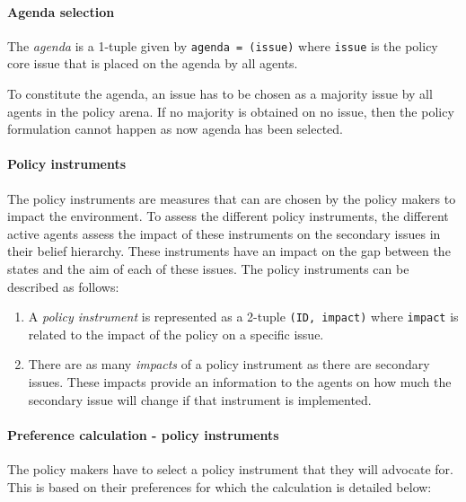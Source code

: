 \documentclass[11pt]{article}
\begin{document}
\paragraph{Agenda selection}

The \emph{agenda} is a 1-tuple given by \texttt{agenda = (issue)} where \texttt{issue} is the policy core issue that is placed on the agenda by all agents.

To constitute the agenda, an issue has to be chosen as a majority issue by all agents in the policy arena. If no majority is obtained on no issue, then the policy formulation cannot happen as now agenda has been selected.


\paragraph{Policy instruments}

The policy instruments are measures that can are chosen by the policy makers to impact the environment. To assess the different policy instruments, the different active agents assess the impact of these instruments on the secondary issues in their belief hierarchy. These instruments have an impact on the gap between the states and the aim of each of these issues. The policy instruments can be described as follows:

\begin{enumerate}
\item A \emph{policy instrument} is represented as a 2-tuple \texttt{(ID, impact)} where \texttt{impact} is related to the impact of the policy on a specific issue.

\item There are as many \emph{impacts} of a policy instrument as there are secondary issues. These impacts provide an information to the agents on how much the secondary issue will change if that instrument is implemented.

\end{enumerate}


\paragraph{Preference calculation - policy instruments}

The policy makers have to select a policy instrument that they will advocate for. This is based on their preferences for which the calculation is detailed below:
\end{document}
